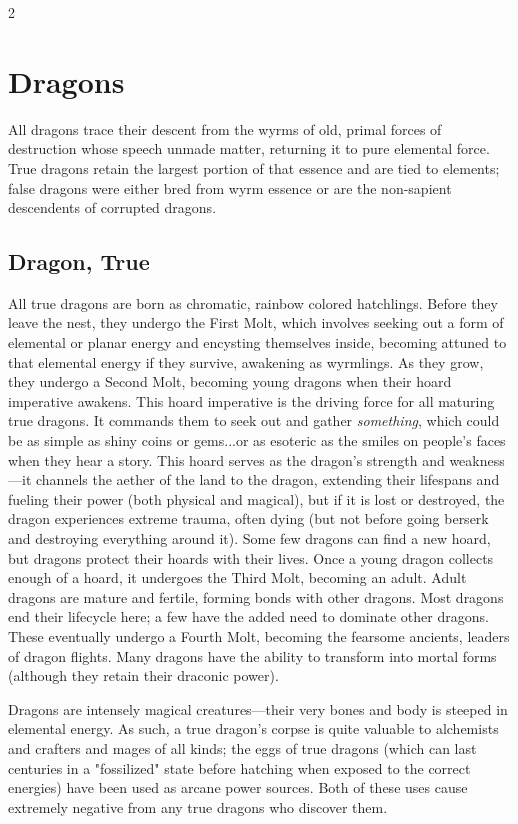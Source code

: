 \clearpage
\begin{multicols}{2}
\section{Dragons}

	\raggedcolumns
All dragons trace their descent from the wyrms of old, primal forces of destruction whose speech unmade matter, returning it to pure elemental force. True dragons retain the largest portion of that essence and are tied to elements; false dragons were either bred from wyrm essence or are the non-sapient descendents of corrupted dragons.

\subsection{Dragon, True}

All true dragons are born as chromatic, rainbow colored hatchlings. Before they leave the nest, they undergo the First Molt, which involves seeking out a form of elemental or planar energy and encysting themselves inside, becoming attuned to that elemental energy if they survive, awakening as wyrmlings. As they grow, they undergo a Second Molt, becoming young dragons when their hoard imperative awakens. This hoard imperative is the driving force for all maturing true dragons. It commands them to seek out and gather \textit{something}, which could be as simple as shiny coins or gems...or as esoteric as the smiles on people's faces when they hear a story. This hoard serves as the dragon's strength and weakness---it channels the aether of the land to the dragon, extending their lifespans and fueling their power (both physical and magical), but if it is lost or destroyed, the dragon experiences extreme trauma, often dying (but not before going berserk and destroying everything around it). Some few dragons can find a new hoard, but dragons protect their hoards with their lives. Once a young dragon collects enough of a hoard, it undergoes the Third Molt, becoming an adult. Adult dragons are mature and fertile, forming bonds with other dragons. Most dragons end their lifecycle here; a few have the added need to dominate other dragons. These eventually undergo a Fourth Molt, becoming the fearsome ancients, leaders of dragon flights. Many dragons have the ability to transform into mortal forms (although they retain their draconic power).

Dragons are intensely magical creatures---their very bones and body is steeped in elemental energy. As such, a true dragon's corpse is quite valuable to alchemists and crafters and mages of all kinds; the eggs of true dragons (which can last centuries in a "fossilized" state before hatching when exposed to the correct energies) have been used as arcane power sources. Both of these uses cause extremely negative from any true dragons who discover them.


\end{multicols}
